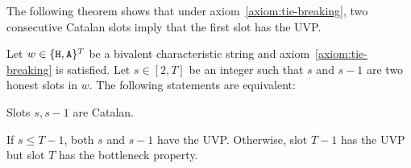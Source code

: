   The following theorem shows that under axiom~\ref{axiom:tie-breaking}, 
  two consecutive Catalan slots 
  imply that the first slot has the UVP.

  \begin{theorem}\label{thm:multiple-honest}
    Let $w \in \{\mathtt{H}, \mathtt{A}\}^T$ be a bivalent characteristic string 
    and axiom~\ref{axiom:tie-breaking} is satisfied.
    Let $s \in[2, T]$ be an integer such that 
    $s$ and $s - 1$ are two honest slots in $w$. 
    The following statements are equivalent:
    \begin{enumerate*}[label=(\textit{\roman*})]
      \item\label{thm:part-catalan-multiple-honest} 
      Slots $s, s - 1$ are Catalan.

      \item\label{thm:part-cp-multiple-honest} 
      If $s \leq T - 1$, both $s$ and $s - 1$ have the UVP. 
      Otherwise, slot $T - 1$ has the UVP but 
      slot $T$ has the bottleneck property.

    \end{enumerate*}
  \end{theorem}
